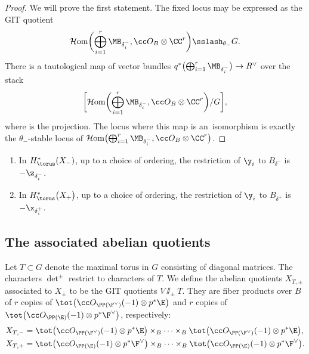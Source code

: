 \begin{proof}
We will prove the first statement. The fixed locus may be expressed as the GIT quotient
\[
\mathcal{H}{\rm om}\biggl(\bigoplus_{i=1}^r \MB_{\delta^-_i}, \cc O_B \otimes \CC^r\biggr) \sslash_{\theta_{-}} G.
\]
There is a tautological map of vector bundles
$q^*\bigl(\bigoplus_{i=1}^r \MB_{\delta^-_i}\bigr) \to R^\vee$
over the stack
\[
\biggl[\mathcal{H}{\rm om}\biggl(\bigoplus_{i=1}^r \MB_{\delta^-_i}, \cc O_B \otimes \CC^r\biggr) / G\biggr],
\]
where  is the projection.
The locus where this map is an~isomorphism is exactly the $\theta_{-}$-stable locus of $\mathcal{H}{\rm om}\bigl( \bigoplus_{i=1}^r \MB_{\delta^-_i}, \cc O_B \otimes \CC^r\bigr)$.
\end{proof}

\begin{Corollary}\label{c:rest}\quad
\begin{enumerate}\itemsep=0pt
\item[$1.$] In $H^*_\torus(X_-)$, up to a choice of ordering, the restriction of $\y_i$ to $B_{\delta^{-}}$ is $-\z_{\delta^{-}_i}$.
\item[$2.$] In $H^*_\torus\bigl(X_+\bigr)$, up to a choice of ordering, the restriction of $\y_i$ to $B_{\delta^{+}}$ is $-\x_{\delta^{+}_i}$.
\end{enumerate}
\end{Corollary}

\subsection{The associated abelian quotients}\label{s:aa}
Let $T \subset G$ denote the maximal torus in $G$ consisting of diagonal matrices. The characters $\det^\pm$ restrict to characters of $T$. We define the abelian quotients $X_{T, \pm}$ associated to $X_\pm$ to be the GIT quotients $V \sslash_\pm T$. They are fiber products over $B$ of $r$ copies of $\tot\bigl(\cc O_{\PP(\F^\vee)}(-1) \otimes p^*\E\bigr)$ and $r$ copies of $\tot\bigl(\cc O_{\PP(\E)}(-1) \otimes p^*\F^\vee\bigr)$, respectively:
\begin{align*}
&X_{T, {-}}= \tot \bigl( \cc O_{\PP(\F^\vee)}(-1) \otimes p^*\E\bigr) \times_B \cdots \times_B \tot \bigl( \cc O_{\PP(\F^\vee)}(-1) \otimes p^*\E\bigr),\\
&X_{T, {+}}= \tot \bigl( \cc O_{\PP(\E)}(-1) \otimes p^*\F^\vee\bigr) \times_B \cdots \times_B \tot \bigl( \cc O_{\PP(\E)}(-1) \otimes p^*\F^\vee\bigr).
\end{align*}

